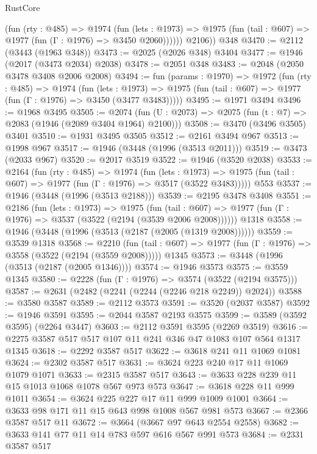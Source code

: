\begin{lexlean}{RustCore}
\begin{coremodule}
            (fun (rty : @485) =>
            @1974
              (fun (lets : @1973) =>
              @1975 (fun (tail : @607) => @1977 (fun (Γ : @1976) => @3450 @2060))))))
        @2106))
    @348
@3470 := @2112 (@3443 (@1963 @348))
@3473 := @2025 (@2026 @348) @3404
@3477 := @1946 (@2017 (@3473 @2034) @2038)
@3478 := @2051 @348
@3483 := @2048 (@2050 @3478 @3408 @2006 @2008)
@3494 := fun (params : @1970) =>
  @1972
    (fun (rty : @485) =>
    @1974
      (fun (lets : @1973) =>
      @1975 (fun (tail : @607) => @1977 (fun (Γ : @1976) => @3450 (@3477 @3483)))))
@3495 := @1971 @3494
@3496 := @1968 @3495
@3505 := @2074 (fun (U : @2073) => @2075 (fun (t : @7) => @2083 (@1946 (@2089 @3404 @1964) @2100)))
@3508 := @3470 (@3496 @3505) @3401
@3510 := @1931 @3495 @3505
@3512 := @2161 @3494 @967
@3513 := @1998 @967
@3517 := @1946 (@3448 (@1996 (@3513 @2011)))
@3519 := @3473 (@2033 @967)
@3520 := @2017 @3519
@3522 := @1946 (@3520 @2038)
@3533 := @2164
    (fun (rty : @485) =>
    @1974
      (fun (lets : @1973) =>
      @1975 (fun (tail : @607) => @1977 (fun (Γ : @1976) => @3517 (@3522 @3483)))))
    @553
@3537 := @1946 (@3448 (@1996 (@3513 @2188)))
@3539 := @2195 @3478 @3408
@3551 := @2186
    (fun (lets : @1973) =>
    @1975
      (fun (tail : @607) => @1977 (fun (Γ : @1976) => @3537 (@3522 (@2194 (@3539 @2006 @2008))))))
    @1318
@3558 := @1946 (@3448 (@1996 (@3513 (@2187 (@2005 (@1319 @2008))))))
@3559 := @3539 @1318
@3568 := @2210
    (fun (tail : @607) => @1977 (fun (Γ : @1976) => @3558 (@3522 (@2194 (@3559 @2008)))))
    @1345
@3573 := @3448 (@1996 (@3513 (@2187 (@2005 @1346))))
@3574 := @1946 @3573
@3575 := @3559 @1345
@3580 := @2228 (fun (Γ : @1976) => @3574 (@3522 (@2194 @3575)))
@3587 := @2631 (@2482 (@2241 (@2244 (@2246 @218 @2249)) @2024))
@3588 := @3580 @3587
@3589 := @2112 @3573
@3591 := @3520 (@2037 @3587)
@3592 := @1946 @3591
@3595 := @2044 @3587 @2193 @3575
@3599 := @3589 (@3592 @3595) (@2264 @3447)
@3603 := @2112 @3591 @3595 (@2269 @3519)
@3616 := @2275 @3587 @517 @517 @107 @11 @241 @346 @47 @1083 @107 @564 @1317 @1345
@3618 := @2292 @3587 @517
@3622 := @3618 @241 @11 @1069 @1081
@3624 := @2302 @3587 @517
@3631 := @3624 @223 @240 @17 @11 @1069 @1079 @1071
@3633 := @2315 @3587 @517
@3643 := @3633 @228 @239 @11 @15 @1013 @1068 @1078 @567 @973 @573
@3647 := @3618 @228 @11 @999 @1011
@3654 := @3624 @225 @227 @17 @11 @999 @1009 @1001
@3664 := @3633 @98 @171 @11 @15 @643 @998 @1008 @567 @981 @573
@3667 := @2366 @3587 @517 @11
@3672 := @3664 (@3667 @97 @643 @2554 @2558)
@3682 := @3633 @141 @77 @11 @14 @783 @597 @616 @567 @991 @573
@3684 := @2331 @3587 @517

\end{coremodule}
\end{lexlean}
